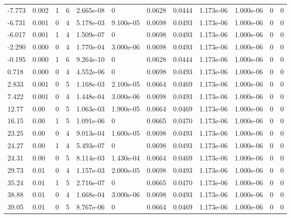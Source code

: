 \documentclass[preview]{standalone}
\begin{document}
{{\begin{tabular}{L{1.2cm}C{1.2cm} C{0.3cm}C{0.5cm} C{1.4cm}C{1.4cm} C{1.4cm}C{1.4cm} C{1.6cm}C{1.6cm} C{1.6cm}C{1.6cm}}
  -7.773  &  0.002  & 1     &  6 &  2.665e-08  & 0  &  0.0628&   0.0444& 1.173e-06 & 1.000e-06   &  0 & 0  \\ 
  -6.731  &  0.001  & 0     &  4 &  5.178e-03  & 9.100e-05  &  0.0698&   0.0493& 1.173e-06 & 1.000e-06   &  0 & 0  \\ 
  -6.017  &  0.001  & 1     &  4 &  1.509e-07  & 0  &  0.0698&   0.0493& 1.173e-06 & 1.000e-06   &  0 & 0  \\ 
  -2.290  &  0.000  & 0     &  4 &  1.770e-04  & 3.000e-06  &  0.0698&   0.0493& 1.173e-06 & 1.000e-06   &  0 & 0  \\ 
  -0.195  &  0.000  & 1     &  6 &  9.264e-10  & 0  &  0.0628&   0.0444& 1.173e-06 & 1.000e-06   &  0 & 0  \\ 
  0.718  &  0.000  & 0     &  4 &  4.552e-06  & 0  &  0.0698&   0.0493& 1.173e-06 & 1.000e-06   &  0 & 0  \\ 
  2.833  &  0.001  & 0     &  5 &  1.168e-03  & 2.100e-05  &  0.0664&   0.0469& 1.173e-06 & 1.000e-06   &  0 & 0  \\ 
  7.422  &  0.001  & 0     &  4 &  1.448e-04  & 3.000e-06  &  0.0698&   0.0493& 1.173e-06 & 1.000e-06   &  0 & 0  \\ 
  12.77  &  0.00  & 0     &  5 &  1.063e-03  & 1.900e-05  &  0.0664&   0.0469& 1.173e-06 & 1.000e-06   &  0 & 0  \\ 
  16.15  &  0.00  & 1     &  5 &  1.091e-06  & 0  &  0.0665&   0.0470& 1.173e-06 & 1.000e-06   &  0 & 0  \\ 
  23.25  &  0.00  & 0     &  4 &  9.013e-04  & 1.600e-05  &  0.0698&   0.0493& 1.173e-06 & 1.000e-06   &  0 & 0  \\ 
  24.27  &  0.00  & 1     &  4 &  5.493e-07  & 0  &  0.0698&   0.0493& 1.173e-06 & 1.000e-06   &  0 & 0  \\ 
  24.31  &  0.00  & 0     &  5 &  8.114e-03  & 1.430e-04  &  0.0664&   0.0469& 1.173e-06 & 1.000e-06   &  0 & 0  \\ 
  29.73  &  0.01  & 0     &  4 &  1.157e-03  & 2.000e-05  &  0.0698&   0.0493& 1.173e-06 & 1.000e-06   &  0 & 0  \\ 
  35.24  &  0.01  & 1     &  5 &  2.716e-07  & 0  &  0.0665&   0.0470& 1.173e-06 & 1.000e-06   &  0 & 0  \\ 
  38.88  &  0.01  & 0     &  4 &  1.668e-04  & 3.000e-06  &  0.0698&   0.0493& 1.173e-06 & 1.000e-06   &  0 & 0  \\ 
  39.05  &  0.01  & 0     &  5 &  8.767e-06  & 0  &  0.0664&   0.0469& 1.173e-06 & 1.000e-06   &  0 & 0  \\ 

\end{tabular}}}
\end{document}
